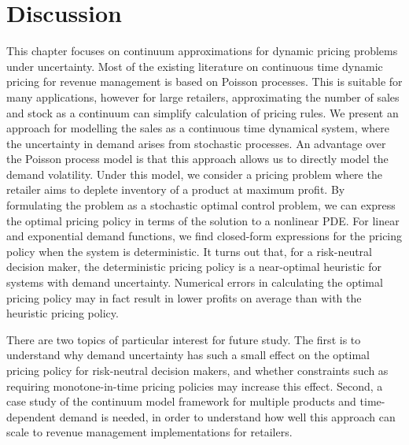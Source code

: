\documentclass[main.tex]{subfiles}
\begin{document}
\section{Discussion}\label{sec:cts_conclusion}
This chapter focuses on continuum approximations for dynamic
pricing problems under uncertainty.
Most of the existing literature on continuous time dynamic pricing for
revenue management is based on Poisson
processes. This is suitable for many applications,
however for large retailers, approximating the number of sales and
stock as a continuum can simplify calculation of pricing rules.
We present an approach for modelling the sales as a continuous time
dynamical system, where the uncertainty in demand arises from
stochastic processes.
An advantage over the Poisson process model is that this approach
allows us to directly model the demand volatility.
Under this model, we consider a pricing problem where the retailer
aims to deplete  inventory of a product at maximum profit.
By formulating the problem as a stochastic optimal control problem,
we can express the optimal pricing policy in terms of the solution to
a nonlinear PDE.\@
For linear and exponential demand functions, we find closed-form
expressions for the pricing policy when the system is deterministic.
It turns out that, for a risk-neutral decision maker, the
deterministic pricing policy is a near-optimal heuristic for systems
with demand uncertainty.
Numerical errors in calculating the optimal pricing policy
may in fact result in lower profits on average than with the heuristic
pricing policy.

There are two topics of particular interest for future study.
The first is to understand why demand uncertainty has such a
small effect on the optimal pricing policy for risk-neutral decision
makers, and whether constraints such as requiring monotone-in-time pricing
policies may increase this effect. Second, a case study of the continuum
model framework for multiple products and time-dependent demand is
needed, in
order to understand how well this approach can scale to revenue
management implementations for retailers.




\biblio{} %
\end{document}
